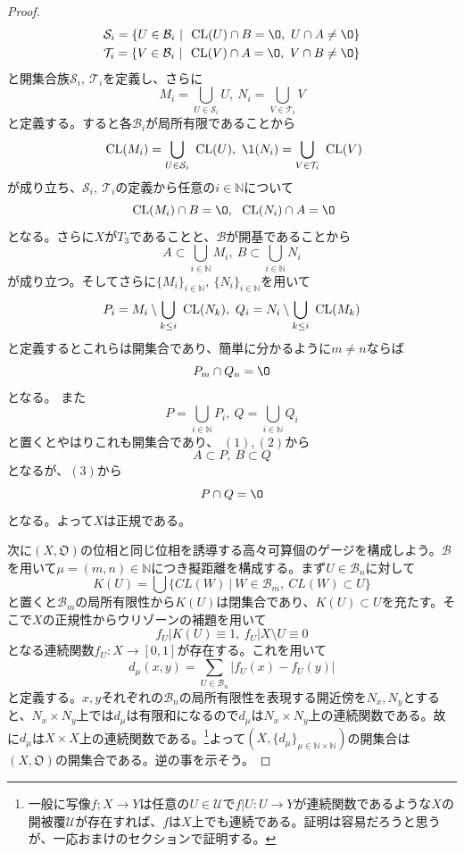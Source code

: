 \documentclass[leqno]{jsarticle}
\newcommand{\nn}{\mathbb{N}}
\newcommand{\cl}{\text{  {\rm CL}} }
\begin{document}
\begin{proof}
\begin{align*}
\mathcal{S}_i=\{U\in \mathcal{B}_i\ |\ \cl(U)\cap B=\O,\ U\cap A\neq \O\}\\
\mathcal{T}_i=\{V\in \mathcal{B}_i\ |\ \cl(V)\cap A=\O,\ V\cap B\neq \O\}
\end{align*}
と開集合族$\mathcal{S}_i,\ \mathcal{T}_i$を定義し、さらに
\[
M_i=\bigcup_{U\in \mathcal{S}_i}U,\ N_i=\bigcup_{V\in \mathcal{T}_i}V
\]
と定義する。すると各$\mathcal{B}_i$が局所有限であることから
\[
\cl(M_i)=\bigcup_{U\in \mathcal{S}_i}\cl(U),\ \l(N_i)=\bigcup_{V\in \mathcal{T}_i}\cl(V)
\]
が成り立ち、$\mathcal{S}_i,\ \mathcal{T}_i$の定義から任意の$i\in \nn$について
\begin{equation}
\cl(M_i)\cap B=\O,\ \cl(N_i)\cap A=\O
\end{equation}
となる。さらに$X$が$T_3$であることと、$\mathcal{B}$が開基であることから
\begin{equation}
A\subset \bigcup_{i\in \nn}M_i,\ B\subset  \bigcup_{i\in \nn}N_i
\end{equation}
が成り立つ。そしてさらに$\{M_i\}_{i\in \nn}, \ \{N_i\}_{i\in \nn}$を用いて
\[
P_i=M_i\setminus \bigcup_{k\le i}\cl(N_k),\ Q_i=N_i\setminus \bigcup_{k\le i}\cl(M_k)
\]
と定義するとこれらは開集合であり、簡単に分かるように$m\neq n$ならば
\begin{equation}
P_m\cap Q_n=\O
\end{equation}
となる。
また
\[
P=\bigcup_{i\in \nn}P_i,\ Q=\bigcup_{i\in \nn}Q_i
\]
と置くとやはりこれも開集合であり、
$(1),(2)$から
\[
A\subset P,\ B\subset Q
\]
となるが、$(3)$から
\[
P\cap Q=\O
\]
となる。よって$X$は正規である。
\par
次に$(X,\mathfrak{O})$の位相と同じ位相を誘導する高々可算個のゲージを構成しよう。$\mathcal{B}$を用いて$\mu=(m,n)\in \nn$につき擬距離を構成する。まず$U\in \mathcal{B}_n$に対して
\[
K(U)=\bigcup\{CL(W)\ |\ W\in \mathcal{B}_m,\ CL(W)\subset U\}
\]
と置くと$\mathcal{B}_m$の局所有限性から$K(U)$は閉集合であり、$K(U)\subset U$を充たす。そこで$X$の正規性からウリゾーンの補題を用いて
\[
f_{U}|K(U)\equiv 1,\ f_U|X\setminus U\equiv 0
\]
となる連続関数$f_U:X\to [0,1]$が存在する。これを用いて
\[
d_{\mu}(x,y)=\sum_{U\in \mathcal{B}_n}|f_{U}(x)-f_U(y)|
\]
と定義する。$x,y$それぞれの$\mathcal{B}_n$の局所有限性を表現する開近傍を$N_x,N_y$とすると、$N_x\times N_y$上では$d_{\mu}$は有限和になるので$d_{\mu}$は$N_x\times N_y$上の連続関数である。故に$d_{\mu}$は$X\times X$上の連続関数である。\footnote{一般に写像$f;X\to Y$は任意の$U\in \mathcal{U}$で$f|U:U\to Y$が連続関数であるような$X$の開被覆$\mathcal{U}$が存在すれば、$f$は$X$上でも連続である。証明は容易だろうと思うが、一応おまけのセクションで証明する。}よって$(X,\{d_{\mu}\}_{\mu\in \nn\times \nn})$の開集合は$(X,\mathfrak{O})$の開集合である。逆の事を示そう。\par 

\end{proof}
\end{document}
